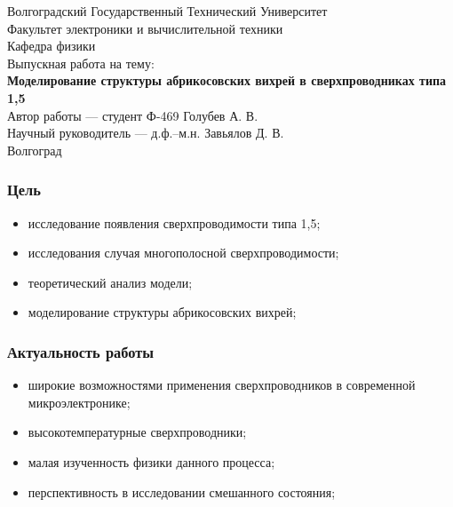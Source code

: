 \begin{frame}
    \begin{center}
        \small
        Волгоградский Государственный Технический Университет \\
        Факультет электроники и вычислительной техники \\
        Кафедра физики \\
        \vspace{1.5cm}
        Выпускная работа на тему: \\
        \normalsize
        \textbf{Моделирование структуры абрикосовских вихрей в 
            сверхпроводниках типа 1,5} \\
        \vspace{1.5cm}
        \small
        Автор работы --- студент Ф-469 Голубев А. В. \\
        Научный руководитель --- д.ф.--м.н. Завьялов Д. В. \\
        \vspace{\fill}
        Волгоград \the\year
    \end{center}
\end{frame}

\begin{frame}
    \frametitle{Цель}
    \begin{itemize}
        \item исследование появления сверхпроводимости типа 1,5;
        \item исследования случая многополосной сверхпроводимости;
        \item теоретический анализ модели;
        \item моделирование структуры абрикосовских вихрей;
    \end{itemize}
\end{frame}

\begin{frame}
    \frametitle{Актуальность работы}
    \begin{itemize}
        \item широкие возможностями применения сверхпроводников в 
            современной микроэлектронике;
        \item высокотемпературные сверхпроводники;
        \item малая изученность физики данного процесса;
        \item перспективность в исследовании смешанного состояния;
    \end{itemize}
\end{frame}

